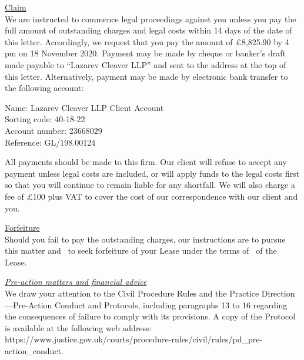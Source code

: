 \documentclass{article}
\begin{document}
\noindent\underline{Claim}\\
We are instructed to commence legal proceedings against you unless you pay the full amount of outstanding charges and legal costs within 14 days of the date of this letter. Accordingly, we request that you pay the amount of £8,825.90 by 4 pm on 18 November 2020. Payment may be made by cheque or banker’s draft made payable to “Lazarev Cleaver LLP” and sent to the address at the top of this letter. Alternatively, payment may be made by electronic bank transfer to the following account:
\vspace{3 mm}
\par
\indent Name: Lazarev Cleaver LLP Client Account\\
\indent Sorting code: 40-18-22\\
\indent Account number: 23668029\\
\indent Reference: GL/198.00124
\vspace{3 mm}
\par
\noindent All payments should be made to this firm. Our client will refuse to accept any payment unless
legal costs are included, or will apply funds to the legal costs first so that you will continue to
remain liable for any shortfall. We will also charge a fee of £100 plus VAT to cover the cost of
our correspondence with our client and you.

\vspace{3 mm}
\par
\noindent\underline{Forfeiture}\\
Should you fail to pay the outstanding charges, our instructions are to pursue this matter and
\forfeitureOne\ to seek forfeiture of your Lease under the terms of \forfeitureTwo\ of the
Lease. 

\vspace{3 mm}
\par

\noindent\textit{\underline{Pre-action matters and financial advice}}\\
We draw your attention to the Civil Procedure Rules and the Practice Direction—Pre-Action
Conduct and Protocols, including paragraphs 13 to 16 regarding the consequences of failure
to comply with its provisions. A copy of the Protocol is available at the following web address:\\
https://www.justice.gov.uk/courts/procedure-rules/civil/rules/pd\_pre-action\_conduct.\\\vspace{1 mm}
\end{document}
